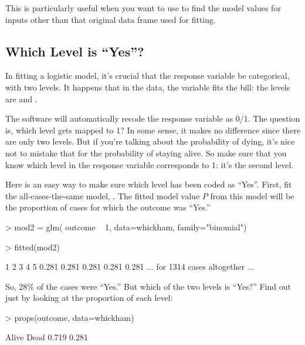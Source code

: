 \noindent This is particularly useful when you want to use  to
find the model values for inputs other than that original data frame
used for fitting.

\subsection{Which Level is ``Yes''?}

In fitting a logistic model, it's crucial that the response variable
be categorical, with two levels.  It happens that in the
 data, the  variable fits the bill: the
levels are  and .

The  software will automatically recode the response
variable as 0/1.  The question is, which level gets mapped to 1?  In
some sense, it makes no difference since there are only two levels.
But if you're talking about the probability of dying, it's nice not
to mistake that for the probability of staying alive.  So make sure
that you know which level in the response variable corresponds to 1:
it's the second level.  

Here is an easy way to make sure which level has been coded as ``Yes''.
First, fit the all-cases-the-same model, .  The
fitted model value $P$ from this model will be the proportion of cases for
which the outcome was ``Yes.''
\begin{Schunk}
\begin{Sinput}
> mod2 = glm( outcome ~ 1, data=whickham, family="binomial")
\end{Sinput}
\end{Schunk}
\begin{Schunk}
\begin{Sinput}
> fitted(mod2)
\end{Sinput}
\end{Schunk}
\begin{Schunk}
\begin{Soutput}
    1     2     3     4     5 
0.281 0.281 0.281 0.281 0.281 
... for 1314 cases altogether ...
\end{Soutput}
\end{Schunk}
So, 28\% of the cases were ``Yes.''  But which of the two levels is ``Yes?''
Find out just by looking at the proportion of each level:
\begin{Schunk}
\begin{Sinput}
> props(outcome, data=whickham)
\end{Sinput}
\begin{Soutput}
Alive  Dead 
0.719 0.281 
\end{Soutput}
\end{Schunk}

